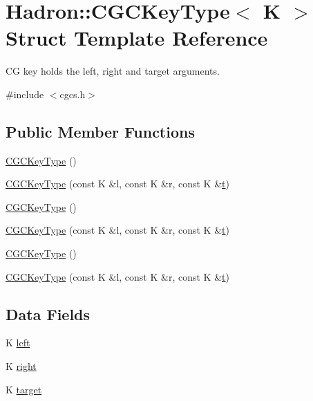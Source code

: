 \hypertarget{structHadron_1_1CGCKeyType}{}\section{Hadron\+:\+:C\+G\+C\+Key\+Type$<$ K $>$ Struct Template Reference}
\label{structHadron_1_1CGCKeyType}


CG key holds the left, right and target arguments.  




{\ttfamily \#include $<$cgcs.\+h$>$}

\subsection*{Public Member Functions}
\begin{DoxyCompactItemize}
\item 
\mbox{\hyperlink{structHadron_1_1CGCKeyType_ae62b61c0cdc189bbdc1fb9c64780f03a}{C\+G\+C\+Key\+Type}} ()
\item 
\mbox{\hyperlink{structHadron_1_1CGCKeyType_a0547a9be19cf1cc084477d2eb8ee5d98}{C\+G\+C\+Key\+Type}} (const K \&l, const K \&r, const K \&\mbox{\hyperlink{adat__devel_2lib_2hadron_2hadron__timeslice_8cc_ac310d9181e916ba43604099aee272c71}{t}})
\item 
\mbox{\hyperlink{structHadron_1_1CGCKeyType_ae62b61c0cdc189bbdc1fb9c64780f03a}{C\+G\+C\+Key\+Type}} ()
\item 
\mbox{\hyperlink{structHadron_1_1CGCKeyType_a0547a9be19cf1cc084477d2eb8ee5d98}{C\+G\+C\+Key\+Type}} (const K \&l, const K \&r, const K \&\mbox{\hyperlink{adat__devel_2lib_2hadron_2hadron__timeslice_8cc_ac310d9181e916ba43604099aee272c71}{t}})
\item 
\mbox{\hyperlink{structHadron_1_1CGCKeyType_ae62b61c0cdc189bbdc1fb9c64780f03a}{C\+G\+C\+Key\+Type}} ()
\item 
\mbox{\hyperlink{structHadron_1_1CGCKeyType_a0547a9be19cf1cc084477d2eb8ee5d98}{C\+G\+C\+Key\+Type}} (const K \&l, const K \&r, const K \&\mbox{\hyperlink{adat__devel_2lib_2hadron_2hadron__timeslice_8cc_ac310d9181e916ba43604099aee272c71}{t}})
\end{DoxyCompactItemize}
\subsection*{Data Fields}
\begin{DoxyCompactItemize}
\item 
K \mbox{\hyperlink{structHadron_1_1CGCKeyType_a3b226cbdc5e984aebb5bffbab67bf3d3}{left}}
\item 
K \mbox{\hyperlink{structHadron_1_1CGCKeyType_a4d75dc8807294fd99260f8ac1baedee3}{right}}
\item 
K \mbox{\hyperlink{structHadron_1_1CGCKeyType_a6e142be2aca9c37be703a19a06c31700}{target}}
\end{DoxyCompactItemize}


